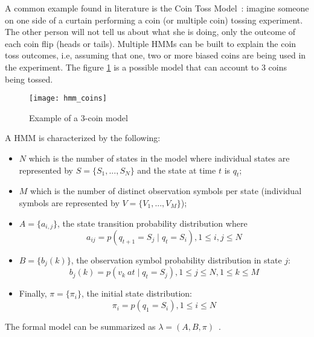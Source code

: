 A common example found in literature is the Coin Toss Model~\cite{Rabiner1989}: 
imagine someone on one side of a curtain performing a coin (or multiple coin) 
tossing experiment. The other person will not tell us about what she is doing, 
only the outcome of each coin flip (heads or tails). Multiple HMMs can be built 
to explain the coin toss outcomes, i.e, assuming that one, two or more biased 
coins are being used in the experiment. The figure \ref{fig:hmm_coins} is a 
possible model that can account to 3 coins being tossed.

\begin{figure}[t]
    \begin{center}
        \leavevmode
        \texttt{[image: hmm\_coins]}
        \caption{Example of a 3-coin model \cite{Rabiner1989}}
        \label{fig:hmm_coins}
    \end{center}
\end{figure}

A HMM is characterized by the following:
\begin{itemize}
    \item $ N $ which is the number of states in the model where individual 
    states are represented by $ S = \{ S_{1}, ..., S_{N} \} $ and the state at 
    time $ t $ is $ q_{t} $;
    \item $ M $ which is the number of distinct observation symbols per state 
    (individual symbols are represented by $ V = \{V_{1}, ..., V_{M} \} $);
    \item $ A = \{ a_{i, j} \} $, the state transition probability 
    distribution where
    \begin{equation}
    a_{ij} = p(q_{t+1} = S_{j} \mid q_{t} = S_{i}), 1 \leq i, j \leq N
    \end{equation}
    \item $ B = \{ b_{j}(k) \} $, the observation symbol probability 
    distribution in state $ j $:
    \begin{equation}
    b_{j}(k) = p(v_{k}~at \mid q_{t} = S_{j}), 1 \leq j \leq N, 1 \leq k 
    \leq M
    \end{equation}
    \item Finally, $ \pi = \{ \pi_{i} \} $, the initial state distribution:
    \begin{equation}
    \pi_{i} = p(q_{1} = S_{i}), 1 \leq i \leq N
    \end{equation}
\end{itemize}

The formal model can be summarized as $ \lambda = (A, B, \pi) 
$~\cite{Rabiner1989}.

